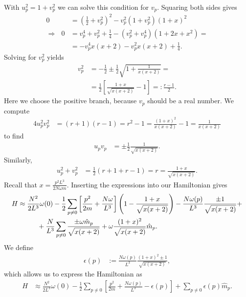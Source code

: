 \documentclass[english, parskip=full]{scrartcl}
\newcommand{\kla}{}
\newcommand{\klam}{}
\begin{document}
With $u_p^2=1+v_p^2$ we can solve this condition for $v_p$.
Squaring both sides gives
\begin{align}
0&=\kla\left( {\frac{1}{2}+v_p^2} \right)^2-v_p^2(1+v_p^2)(1+x)^2\\
\Rightarrow\ \ \ 0&=v_p^4+v_p^2+\frac{1}{4}-\kla\left( {v_p^2+v_p^4} \right)\kla\left( {1+2x+x^2} \right)=\\
&=-v_p^4x(x+2)-v_p^2x(x+2)+\frac{1}{4}.
\end{align}
Solving for $v_p^2$ yields
\begin{align}
v_p^2&=-\frac{1}{2}\pm\frac{1}{2}\sqrt{1+\frac{1}{x(x+2)}}=\\
&=\frac{1}{2}\klam\left[ {\frac{1+x}{\sqrt{x(x+2)}}-1} \right]=:\frac{r-1}{2}.
\end{align}
Here we choose the positive branch, because $v_p$ should be a real number.
We compute
\begin{align}
4u_p^2v_p^2&=(r+1)(r-1)=r^2-1=\frac{(1+x)^2}{x(x+2)}-1=\frac{1}{x(x+2)}
\end{align}
to find
\begin{align}
u_pv_p&=\pm\frac{1}{2}\frac{1}{\sqrt{x(x+2)}}.
\end{align}
Similarly,
\begin{align}
u_p^2+v_p^2&=\frac{1}{2}\kla\left( {r+1+r-1} \right)=r=\frac{1+x}{\sqrt{x(x+2)}}.
\end{align}
Recall that $x=\frac{p^2L^3}{2N\omega m}$. 
Inserting the expressions into our Hamiltonian  gives
\begin{align}
H&\approx\frac{N^2}{2L^3}\omega (0)-\frac{1}{2}\sum_{p\neq 0}\klam\left[ {\frac{p^2}{2m}+\frac{N\omega}{L^3}} \right]\kla\left( {1-\frac{1+x}{\sqrt{x(x+2)}}} \right)-\frac{N\omega (p)}{L^3}\frac{\pm 1}{\sqrt{x(x+2)}}+\\
&\hspace*{1cm} +\frac{N}{L^3}\sum_{p\neq 0}\frac{\pm\omega\hat{m}_p}{\sqrt{x(x+2)}}+\omega\frac{(1+x)^2}{\sqrt{x(x+2)}}\hat{m}_p.
\end{align}
We define
\begin{align}
\epsilon (p)&:=\frac{N\omega (p)}{L^3}\frac{(1+x)^2\pm 1}{\sqrt{x(x+2)}},
\end{align}
which allows us to express the Hamiltonian as
\begin{align}
H&\approx\frac{N^2}{2L^3}\omega (0)-\frac{1}{2}\sum_{p\neq 0}\klam\left[ {\frac{p^2}{2m}+\frac{N\omega (p)}{L^3}-\epsilon (p)} \right]+\sum_{p\neq 0}\epsilon (p)\hat{m}_p.
\end{align}
\end{document}
